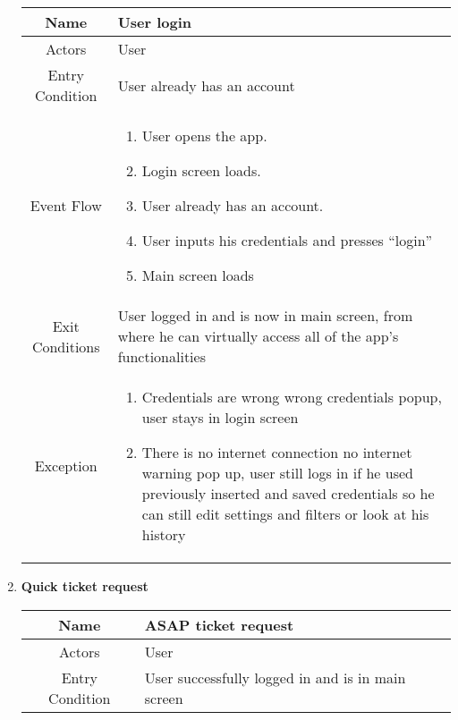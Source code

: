 \begin{enumerate}
\begin{table}[H]
{
	\begin{tabular}{|c|p{14cm}|}
		\hline
		Name & User login\\
		\hline
		Actors & User\\
		\hline
		Entry Condition & User already has an account\\
		\hline
		Event Flow & \begin{enumerate}
			\item User opens the app.
			\item Login screen loads.
			\item User already has an account.
			\item User inputs his credentials and presses “login”
			\item Main screen loads
		\end{enumerate}\\
		\hline
		Exit Conditions & User logged in and is now in main screen, from where he can virtually access all of the app’s functionalities\\
		\hline
		Exception & \begin{enumerate}
			\item Credentials are wrong\newline
			wrong credentials popup, user stays in  login screen
			
			\item There is no internet connection\newline
			no internet warning pop up, user still logs in if he used previously inserted and saved credentials so he can still edit settings and filters or look at his history 
			
		\end{enumerate}\\
		
		\hline
	\end{tabular}
}
\end{table}

\item \textbf{Quick ticket request}
	
\begin{table}[H]
{
	\begin{tabular}{|c|p{14cm}|}
		\hline
		Name & ASAP ticket request\\
		\hline
		Actors & User\\
		\hline
		Entry Condition & User successfully logged in and is in main screen\\
		\hline
		

\end{tabular}}
\end{table}
\end{enumerate}
